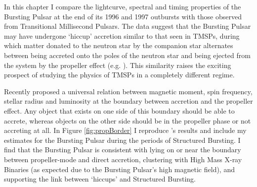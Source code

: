 \par In this chapter I compare the lightcurve, spectral and timing properties of the Bursting Pulsar at the end of its 1996 and 1997 outbursts with those observed from Transitional Millisecond Pulsars. The data suggest that the Bursting Pulsar may have undergone `hiccup' accretion similar to that seen in TMSPs, during which matter donated to the neutron star by the companion star alternates between being accreted onto the poles of the neutron star and being ejected from the system by the propeller effect (e.g. \citealp{Ferrigno_TMSPVar}). This similarity raises the exciting prospect of studying the physics of TMSPs in a completely different regime.
\par Recently \citealp{Campana_PropBorder} proposed a universal relation between magnetic moment, spin frequency, stellar radius and luminosity at the boundary between accretion and the propeller effect. Any object that exists on one side of this boundary should be able to accrete, whereas objects on the other side should be in the propeller phase or not accreting at all. In Figure \ref{fig:propBorder} I reproduce \citealp{Campana_PropBorder}'s results and include my estimates for the Bursting Pulsar during the periods of Structured Bursting. I find that the Bursting Pulsar is consistent with lying on or near the boundary between propeller-mode and direct accretion, clustering with High Mass X-ray Binaries (as expected due to the Bursting Pulsar's high magnetic field), and supporting the link between `hiccups' and Structured Bursting.

